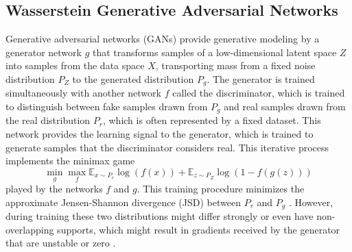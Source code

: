 \documentclass{article}
\begin{document}
\subsection{Wasserstein Generative Adversarial Networks}
Generative adversarial networks (GANs) provide generative modeling by a generator network $g$ that transforms samples of a low-dimensional latent space $Z$ into samples from the data space $X$, transporting mass from a fixed noise distribution $P_Z$ to the generated distribution $P_g$. The generator is trained simultaneously with another network $f$ called the discriminator, which is trained to distinguish between fake samples drawn from $P_g$ and real samples drawn from the real distribution $P_r$, which is often represented by a fixed dataset. This network provides the learning signal to the generator, which is trained to generate samples that the discriminator considers real. This iterative process implements the minimax game
\begin{equation}
\min_g \max_f \mathbb{E}_{x \sim P_r}\log(f(x))
+\mathbb{E}_{z \sim P_Z}\log(1 - f(g(z)))
\end{equation}
played by the networks $f$ and $g$. This training procedure minimizes the approximate Jensen-Shannon divergence (JSD) between $P_r$ and $P_g$ \citep{Goodfellowetal2014a}. However, during training these two distributions might differ strongly or even have non-overlapping supports, which might result in gradients received by the generator that are unstable or zero \citep{Arjovskyetal2017b}.
\end{document}
